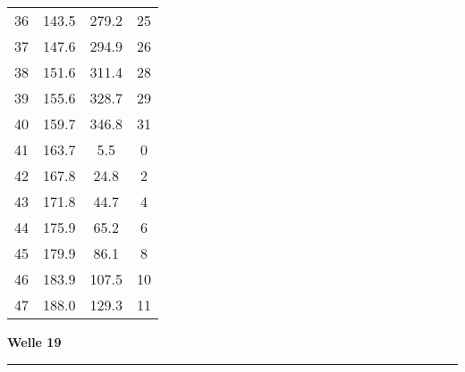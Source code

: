 \documentclass[10pt, a4paper]{article}
\begin{document}
\begin{center}
\begin{tabular}{c|c|c|c}
		36 & 143.5 & 279.2 & 25 \\
		37 & 147.6 & 294.9 & 26 \\
		38 & 151.6 & 311.4 & 28 \\
		39 & 155.6 & 328.7 & 29 \\
		40 & 159.7 & 346.8 & 31 \\
		41 & 163.7 & 5.5 & 0 \\
		42 & 167.8 & 24.8 & 2 \\
		43 & 171.8 & 44.7 & 4 \\
		44 & 175.9 & 65.2 & 6 \\
		45 & 179.9 & 86.1 & 8 \\
		46 & 183.9 & 107.5 & 10 \\
		47 & 188.0 & 129.3 & 11 \\
	\end{tabular}
\end{center}
\newpage
\centerline{{\bf Welle 19} }
\rule{1.0\textwidth}{0.5mm}
\end{document}

